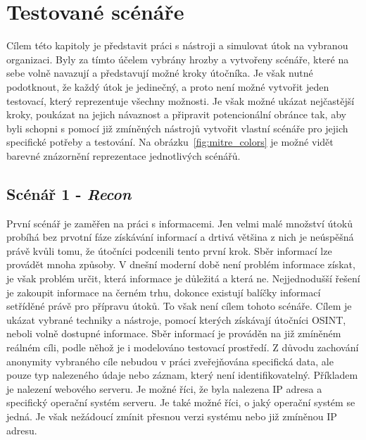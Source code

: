 \section{Testované scénáře}\label{subsec:testovane-scenare}
Cílem této kapitoly je představit práci s nástroji a simulovat útok na vybranou organizaci.
Byly za tímto účelem vybrány hrozby a vytvořeny scénáře, které na sebe volně navazují a představují možné kroky útočníka.
Je však nutné podotknout, že každý útok je jedinečný, a proto není možné vytvořit jeden testovací, který reprezentuje všechny možnosti.
Je však možné ukázat nejčastější kroky, poukázat na jejich návaznost a připravit potencionální obránce tak, aby byli schopni s pomocí již zmíněných nástrojů vytvořit vlastní scénáře pro jejich specifické potřeby a testování.
Na obrázku~\ref{fig:mitre_colors} je možné vidět barevné znázornění reprezentace jednotlivých scénářů.



\subsection{Scénář 1 - \textit{Recon}}
První scénář je zaměřen na práci s informacemi.
Jen velmi malé množství útoků probíhá bez prvotní fáze získávání informací a drtivá většina z nich je neúspěšná právě kvůli tomu, že útočníci podcenili tento první krok.
Sběr informací lze provádět mnoha způsoby.
V dnešní moderní době není problém informace získat, je však problém určit, která informace je důležitá a která ne.
Nejjednodušší řešení je zakoupit informace na černém trhu, dokonce existují balíčky informací setříděné právě pro přípravu útoků.
To však není cílem tohoto scénáře.
Cílem je ukázat vybrané techniky a nástroje, pomocí kterých získávají útočníci \ac{OSINT}, neboli volně dostupné informace.
Sběr informací je prováděn na již zmíněném reálném cíli, podle něhož je i modelováno testovací prostředí.
Z důvodu zachování anonymity vybraného cíle nebudou v práci zveřejňována specifická data, ale pouze typ nalezeného údaje nebo záznam, který není identifikovatelný.
Příkladem je nalezení webového serveru.
Je možné říci, že byla nalezena IP adresa a specifický operační systém serveru.
Je také možné říci, o jaký operační systém se jedná.
Je však nežádoucí zmínit přesnou verzi systému nebo již zmíněnou IP adresu.


